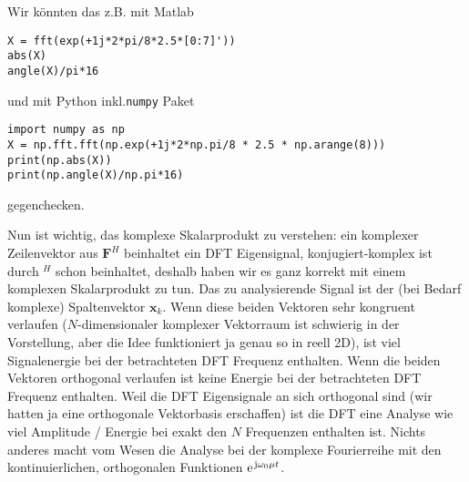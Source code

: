 \begin{ExCalc}

%
Wir könnten das z.B. mit Matlab
\begin{verbatim}
X = fft(exp(+1j*2*pi/8*2.5*[0:7]'))
abs(X)
angle(X)/pi*16
\end{verbatim}
und mit Python inkl.\texttt{numpy} Paket
\begin{verbatim}
import numpy as np
X = np.fft.fft(np.exp(+1j*2*np.pi/8 * 2.5 * np.arange(8)))
print(np.abs(X))
print(np.angle(X)/np.pi*16)
\end{verbatim}
gegenchecken.
%

Nun ist wichtig, das komplexe Skalarprodukt zu verstehen: ein komplexer
Zeilenvektor aus $\bm{F}^H$ beinhaltet ein DFT Eigensignal,
konjugiert-komplex ist durch $^H$ schon beinhaltet,
deshalb haben wir es ganz korrekt mit einem komplexen Skalarprodukt zu tun.
Das zu analysierende Signal ist der (bei Bedarf komplexe) Spaltenvektor $\bm{x}_k$.
Wenn diese beiden Vektoren sehr kongruent verlaufen ($N$-dimensionaler
komplexer Vektorraum ist schwierig in der Vorstellung, aber die Idee funktioniert
ja genau so in reell 2D), ist viel Signalenergie
bei der betrachteten DFT Frequenz enthalten. Wenn die beiden Vektoren orthogonal
verlaufen ist keine Energie bei der betrachteten DFT Frequenz enthalten.
%
Weil die DFT Eigensignale an sich orthogonal sind (wir hatten ja eine orthogonale
Vektorbasis erschaffen) ist die DFT eine Analyse wie viel Amplitude / Energie
bei exakt den $N$ Frequenzen enthalten ist. Nichts anderes macht vom Wesen
die Analyse bei der komplexe Fourierreihe mit den kontinuierlichen, orthogonalen
Funktionen $\e^{\im\omega_0 \mu t}$.
%


\end{ExCalc}
